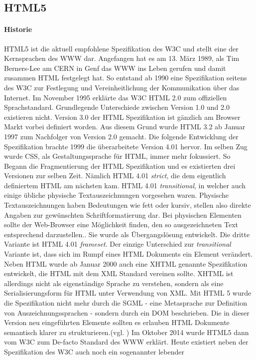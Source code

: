 \documentclass[12pt,a4paper,bibliography=totocnumbered,listof=totocnumbered]{scrartcl}
\begin{document}
\subsection{HTML5}
\paragraph{Historie} \ac{HTML}5 ist die aktuell empfohlene Spezifikation des \ac{W3C} und stellt eine der Kernsprachen des \ac{WWW} dar. Angefangen hat es am 13. März 1989, als Tim Berners-Lee am CERN in Genf das \ac{WWW} ins Leben gerufen und damit zusammen \ac{HTML} festgelegt hat. So entstand ab 1990 eine Spezifikation seitens des \ac{W3C} zur Festlegung und Vereinheitlichung der Kommunikation über das Internet. Im November 1995 erklärte das \ac{W3C} \ac{HTML} 2.0 zum offiziellen Sprachstandard. Grundlegende Unterschiede zwischen Version 1.0 und 2.0 existieren nicht. Version 3.0 der \ac{HTML} Spezifikation ist gänzlich am Browser Markt vorbei definiert worden. Aus diesem Grund wurde \ac{HTML} 3.2 ab Januar 1997 zum Nachfolger von Version 2.0 gemacht. Die folgende Entwicklung der Spezifikation brachte 1999 die überarbeitete Version 4.01 hervor. Im selben Zug wurde \ac{CSS}, als Gestaltungssprache für \ac{HTML}, immer mehr fokussiert. So Begann die Fragmentierung der \ac{HTML} Spezifikation und es existierten drei Versionen zur selben Zeit. Nämlich \ac{HTML} 4.01 \textit{strict}, die dem eigentlich definiertem HTML am nächsten kam. \ac{HTML} 4.01 \textit{transitional}, in welcher auch einige übliche physische Textauszeichnungen vorgesehen waren. \glqq Physische Textauszeichnungen haben Bedeutungen wie \glqq fett\grqq{} oder \glqq kursiv\grqq{}, stellen also direkte Angaben zur gewünschten Schriftformatierung dar. Bei physischen Elementen sollte der Web-Browser eine Möglichkeit finden, den so ausgezeichneten Text entsprechend darzustellen.\grqq{}\cite{SelfHTML20141}. Sie wurde als Übergangslösung entwickelt. Die dritte Variante ist \ac{HTML} 4.01 \textit{frameset}. Der einzige Unterschied zur \textit{transitional} Variante ist, dass sich im Rumpf eines HTML Dokuments ein Element verändert. Neben \ac{HTML} wurde ab Januar 2000 auch eine \ac{XHTML} genannte Spezifikation entwickelt, die \ac{HTML} mit dem \ac{XML} Standard vereinen sollte. \ac{XHTML} ist allerdings nicht als eigenständige Sprache zu verstehen, sondern als eine Serialisierungsform für \ac{HTML} unter Verwendung von \ac{XML}. Mit \ac{HTML} 5 wurde die Spezifikation nicht mehr durch die \ac{SGML} - eine Metasprache zur Definition von Auszeichnungssprachen - sondern durch ein \ac{DOM} beschrieben. Die in dieser Version neu eingeführten Elemente sollten es erlauben \ac{HTML} Dokumente semantisch klarer zu strukturieren.(vgl. \cite[S.20ff]{MunzHTML2012}) Im Oktober 2014 wurde \ac{HTML}5 dann vom \ac{W3C} zum De-facto Standard des \ac{WWW} erklärt. Heute existiert neben der Spezifikation des \ac{W3C} auch noch ein sogenannter \glqq lebender 
\end{document}
